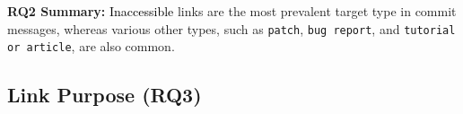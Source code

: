 \documentclass[smallextended]{svjour3}       %
\newcommand{\fix}[1]{\textcolor{black}{#1}}
\newcommand{\minor}[1]{\textcolor{black}{#1}}
\begin{document}








\begin{tcolorbox}
\textbf{RQ2 Summary:} 
\minor{Inaccessible} links are the most prevalent target type in commit messages, whereas various other types,
such as \texttt{patch}, \texttt{bug report}, and \texttt{tutorial or article}, are also common.
\end{tcolorbox}




\subsection{Link Purpose (RQ3)}
\end{document}
